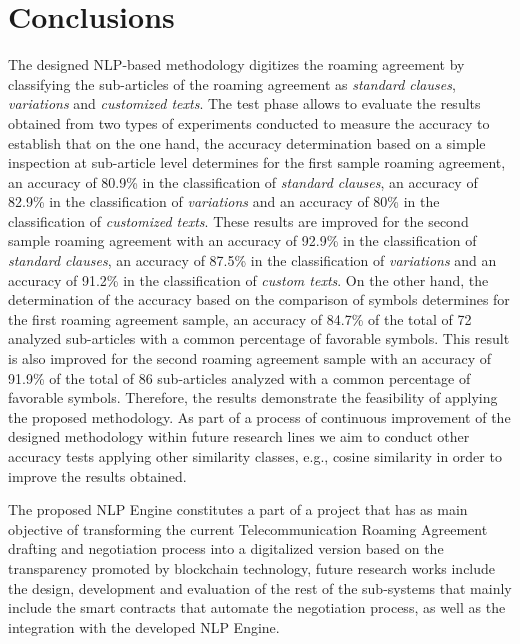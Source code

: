 \section{Conclusions}
The designed NLP-based methodology digitizes the roaming agreement by classifying the sub-articles of the roaming agreement as \textit{standard clauses}, \textit{variations} and \textit{customized texts}. The test phase allows to evaluate the results obtained from two types of experiments conducted to measure the accuracy to establish that on the one hand, the accuracy  determination  based  on  a  simple  inspection  at sub-article level determines for the first sample roaming agreement, an accuracy of 80.9\% in the classification of \textit{standard clauses}, an accuracy of 82.9\% in the classification of \textit{variations} and an accuracy of 80\% in the classification of \textit{customized texts}. These results are improved for the second sample roaming agreement with an accuracy of 92.9\% in the classification of \textit{standard clauses}, an accuracy of 87.5\% in the classification of \textit{variations} and an accuracy of 91.2\% in the classification of \textit{custom texts}. On the other hand, the determination of the accuracy based on the comparison of symbols determines for the first roaming agreement sample, an accuracy of 84.7\% of the total of 72 analyzed sub-articles with a common percentage of favorable symbols. This result is also improved for the second roaming agreement sample with an accuracy of 91.9\% of the total of 86 sub-articles analyzed with a common percentage of favorable symbols. Therefore, the results demonstrate the feasibility of applying the proposed methodology. As part of a process of continuous improvement of the designed methodology within future research lines we aim to conduct other accuracy tests applying other similarity classes, e.g., cosine similarity in order to improve the results obtained.

The proposed NLP Engine constitutes a part of a project that has as main objective of transforming the current Telecommunication Roaming Agreement drafting and negotiation process into a digitalized version based on the transparency promoted by blockchain technology, future research works include the design, development and evaluation of the rest of the sub-systems that mainly include the smart contracts that automate the negotiation process, as well as the integration with the developed NLP Engine.
